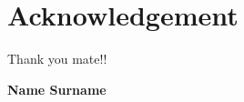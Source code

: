 \chapter*{Acknowledgement}

Thank you mate!!



\vspace{1cm}
\begin{flushright}
\textbf{Name Surname} %
\end{flushright}
\clearpage